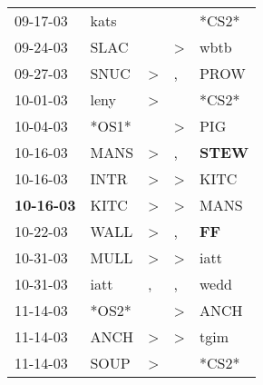 \begin{supertabular}{p{0.07\textwidth}p{0.06\textwidth}p{0.02\textwidth}p{0.02\textwidth}p{0.06\textwidth}}
          09-17-03\textsuperscript{} &           kats\textsuperscript{} &                  &                  &                            *CS2* \\
          09-24-03\textsuperscript{} &           SLAC\textsuperscript{} &                  &     \textgreater &           wbtb\textsuperscript{} \\
          09-27-03\textsuperscript{} &           SNUC\textsuperscript{} &     \textgreater &                , &           PROW\textsuperscript{} \\
          10-01-03\textsuperscript{} &           leny\textsuperscript{} &     \textgreater &                  &                            *CS2* \\
          10-04-03\textsuperscript{} &                            *OS1* &                  &     \textgreater &            PIG\textsuperscript{} \\
          10-16-03\textsuperscript{} &           MANS\textsuperscript{} &     \textgreater &                , &  \textbf{STEW\textsuperscript{}} \\
          10-16-03\textsuperscript{} &           INTR\textsuperscript{} &     \textgreater &     \textgreater &           KITC\textsuperscript{} \\
 \textbf{10-16-03\textsuperscript{}} &           KITC\textsuperscript{} &     \textgreater &     \textgreater &           MANS\textsuperscript{} \\
          10-22-03\textsuperscript{} &           WALL\textsuperscript{} &     \textgreater &                , &    \textbf{FF\textsuperscript{}} \\
          10-31-03\textsuperscript{} &           MULL\textsuperscript{} &     \textgreater &     \textgreater &           iatt\textsuperscript{} \\
          10-31-03\textsuperscript{} &           iatt\textsuperscript{} &                , &                , &           wedd\textsuperscript{} \\
          11-14-03\textsuperscript{} &                            *OS2* &                  &     \textgreater &           ANCH\textsuperscript{} \\
          11-14-03\textsuperscript{} &           ANCH\textsuperscript{} &     \textgreater &     \textgreater &           tgim\textsuperscript{} \\
          11-14-03\textsuperscript{} &           SOUP\textsuperscript{} &     \textgreater &                  &                            *CS2* \\

\end{supertabular}
